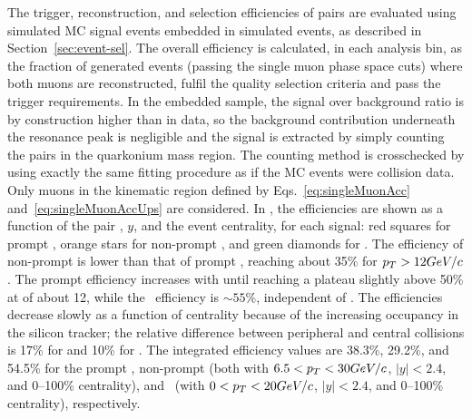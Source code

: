 The trigger, reconstruction, and selection efficiencies of \mumu pairs
are evaluated using simulated MC signal events embedded in simulated
\PbPb events, as described in Section~\ref{sec:event-sel}. The overall
efficiency is calculated, in each analysis bin, as the fraction of
generated events (passing the single muon phase space cuts) where both
muons are reconstructed, fulfil the quality selection criteria and
pass the trigger requirements. In the embedded sample, the signal over
background ratio is by construction higher than in data, so the
background contribution underneath the resonance peak is negligible
and the signal is extracted by simply counting the \mumu pairs in the
quarkonium mass region. The counting method is crosschecked by using
exactly the same fitting procedure as if the MC events were collision
data. Only muons in the kinematic region defined by
Eqs.~\eqref{eq:singleMuonAcc} and~\eqref{eq:singleMuonAccUps} are
considered.
In , the efficiencies are shown as a function of the
\mumu pair \pt, $y$, and the event centrality, for each signal: red
squares for prompt \Jpsi, orange stars for non-prompt \Jpsi, and green
diamonds for \PgUa. The efficiency of non-prompt \Jpsi is lower than that 
of prompt \Jpsi, reaching about 35\% for $p_T > 12GeV/c$. 
The prompt \Jpsi efficiency increases with \pt until reaching a plateau 
slightly above 50\% at \pt
of about 12\GeVc, while the \PgUa\ efficiency is $\sim\!55\%$,
independent of \pt. The efficiencies decrease slowly as a function of
centrality because of the increasing occupancy in the silicon tracker;
the relative difference between peripheral and central collisions is
17\% for \Jpsi and 10\% for \PgUa. The integrated efficiency values
are 38.3\%, 29.2\%, and 54.5\% for the prompt \Jpsi, non-prompt \Jpsi
(both with $6.5<p_T<30GeV/c$, $|y|<2.4$, and 0--100\% centrality), and
\PgUa\ (with $0<p_T<20GeV/c$, $|y|<2.4$, and 0--100\% centrality),
respectively.
